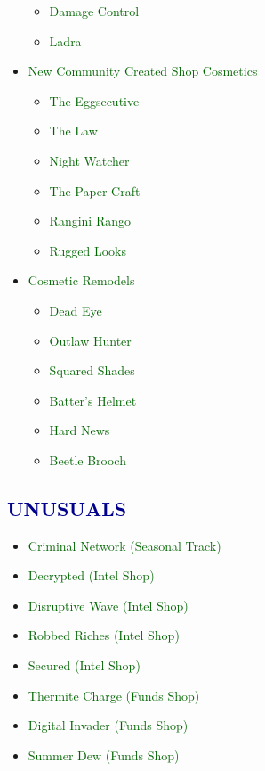 \documentclass{article}
\begin{document}
\begin{itemize}
\begin{itemize}
        \item \textcolor{darkgreen}{Damage Control}
        \item \textcolor{darkgreen}{Ladra}
    \end{itemize}
    \item \textcolor{darkgreen}{New Community Created Shop Cosmetics}
    \begin{itemize}
        \item \textcolor{darkgreen}{The Eggsecutive}
        \item \textcolor{darkgreen}{The Law}
        \item \textcolor{darkgreen}{Night Watcher}
        \item \textcolor{darkgreen}{The Paper Craft}
        \item \textcolor{darkgreen}{Rangini Rango}
        \item \textcolor{darkgreen}{Rugged Looks}
    \end{itemize}
    \item \textcolor{darkgreen}{Cosmetic Remodels}
    \begin{itemize}
        \item \textcolor{darkgreen}{Dead Eye}
        \item \textcolor{darkgreen}{Outlaw Hunter}
        \item \textcolor{darkgreen}{Squared Shades}
        \item \textcolor{darkgreen}{Batter’s Helmet}
        \item \textcolor{darkgreen}{Hard News}
        \item \textcolor{darkgreen}{Beetle Brooch}
    \end{itemize}
\end{itemize}




\subsection*{\textcolor{darkblue}{UNUSUALS}}

\begin{itemize}
    \item \textcolor{darkgreen}{Criminal Network (Seasonal Track)}
    \item \textcolor{darkgreen}{Decrypted (Intel Shop)}
    \item \textcolor{darkgreen}{Disruptive Wave (Intel Shop)}
    \item \textcolor{darkgreen}{Robbed Riches (Intel Shop)}
    \item \textcolor{darkgreen}{Secured (Intel Shop)}
    \item \textcolor{darkgreen}{Thermite Charge (Funds Shop)}
    \item \textcolor{darkgreen}{Digital Invader (Funds Shop)}
    \item \textcolor{darkgreen}{Summer Dew (Funds Shop)}
\end{itemize}
\end{document}
